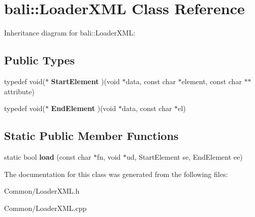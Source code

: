\hypertarget{classbali_1_1_loader_x_m_l}{\section{bali\-:\-:Loader\-X\-M\-L Class Reference}
\label{classbali_1_1_loader_x_m_l}
}


Inheritance diagram for bali\-:\-:Loader\-X\-M\-L\-:
\subsection*{Public Types}
\begin{DoxyCompactItemize}
\item 
\hypertarget{classbali_1_1_loader_x_m_l_aa9f096d126f9456007b2c0f853f0c236}{typedef void($\ast$ {\bfseries Start\-Element} )(void $\ast$data, const char $\ast$element, const char $\ast$$\ast$attribute)}\label{classbali_1_1_loader_x_m_l_aa9f096d126f9456007b2c0f853f0c236}

\item 
\hypertarget{classbali_1_1_loader_x_m_l_aa9b32a842d573d589c1096c9ddce43e4}{typedef void($\ast$ {\bfseries End\-Element} )(void $\ast$data, const char $\ast$el)}\label{classbali_1_1_loader_x_m_l_aa9b32a842d573d589c1096c9ddce43e4}

\end{DoxyCompactItemize}
\subsection*{Static Public Member Functions}
\begin{DoxyCompactItemize}
\item 
\hypertarget{classbali_1_1_loader_x_m_l_a7c8de6ec3025a9404f9d58da8562a80d}{static bool {\bfseries load} (const char $\ast$fn, void $\ast$ud, Start\-Element se, End\-Element ee)}\label{classbali_1_1_loader_x_m_l_a7c8de6ec3025a9404f9d58da8562a80d}

\end{DoxyCompactItemize}


The documentation for this class was generated from the following files\-:\begin{DoxyCompactItemize}
\item 
Common/Loader\-X\-M\-L.\-h\item 
Common/Loader\-X\-M\-L.\-cpp\end{DoxyCompactItemize}
